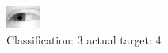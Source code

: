 \begin{figure}[h!]
\begin{center}
\includegraphics[width=0.60\columnwidth]{figures/ID2455_class_3_target_4.png}
\end{center}
\caption{ Classification: 3 actual target: 4}
\label{fig:ID2455_class_3_target_4}
\end{figure}
